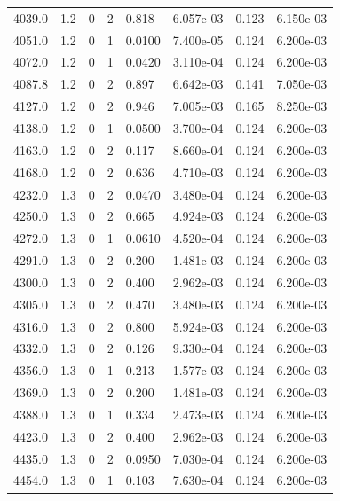 \documentclass[preview]{standalone}
\begin{document}
{{{{{{{\begin{tabular}{L{1.2cm}C{1.2cm} C{0.3cm}C{0.5cm} C{1.4cm}C{1.4cm} C{1.4cm}C{1.4cm}}
  4039.0  &   1.2  & 0     &  2 &  0.818  & 6.057e-03  & 0.123 &  6.150e-03   \\ 
  4051.0  &   1.2  & 0     &  1 &  0.0100  & 7.400e-05  & 0.124 &  6.200e-03   \\ 
  4072.0  &   1.2  & 0     &  1 &  0.0420  & 3.110e-04  & 0.124 &  6.200e-03   \\ 
  4087.8  &   1.2  & 0     &  2 &  0.897  & 6.642e-03  & 0.141 &  7.050e-03   \\ 
  4127.0  &   1.2  & 0     &  2 &  0.946  & 7.005e-03  & 0.165 &  8.250e-03   \\ 
  4138.0  &   1.2  & 0     &  1 &  0.0500  & 3.700e-04  & 0.124 &  6.200e-03   \\ 
  4163.0  &   1.2  & 0     &  2 &  0.117  & 8.660e-04  & 0.124 &  6.200e-03   \\ 
  4168.0  &   1.2  & 0     &  2 &  0.636  & 4.710e-03  & 0.124 &  6.200e-03   \\ 
  4232.0  &   1.3  & 0     &  2 &  0.0470  & 3.480e-04  & 0.124 &  6.200e-03   \\ 
  4250.0  &   1.3  & 0     &  2 &  0.665  & 4.924e-03  & 0.124 &  6.200e-03   \\ 
  4272.0  &   1.3  & 0     &  1 &  0.0610  & 4.520e-04  & 0.124 &  6.200e-03   \\ 
  4291.0  &   1.3  & 0     &  2 &  0.200  & 1.481e-03  & 0.124 &  6.200e-03   \\ 
  4300.0  &   1.3  & 0     &  2 &  0.400  & 2.962e-03  & 0.124 &  6.200e-03   \\ 
  4305.0  &   1.3  & 0     &  2 &  0.470  & 3.480e-03  & 0.124 &  6.200e-03   \\ 
  4316.0  &   1.3  & 0     &  2 &  0.800  & 5.924e-03  & 0.124 &  6.200e-03   \\ 
  4332.0  &   1.3  & 0     &  2 &  0.126  & 9.330e-04  & 0.124 &  6.200e-03   \\ 
  4356.0  &   1.3  & 0     &  1 &  0.213  & 1.577e-03  & 0.124 &  6.200e-03   \\ 
  4369.0  &   1.3  & 0     &  2 &  0.200  & 1.481e-03  & 0.124 &  6.200e-03   \\ 
  4388.0  &   1.3  & 0     &  1 &  0.334  & 2.473e-03  & 0.124 &  6.200e-03   \\ 
  4423.0  &   1.3  & 0     &  2 &  0.400  & 2.962e-03  & 0.124 &  6.200e-03   \\ 
  4435.0  &   1.3  & 0     &  2 &  0.0950  & 7.030e-04  & 0.124 &  6.200e-03   \\ 
  4454.0  &   1.3  & 0     &  1 &  0.103  & 7.630e-04  & 0.124 &  6.200e-03   \\ 

\end{tabular}}}}}}}}
\end{document}
